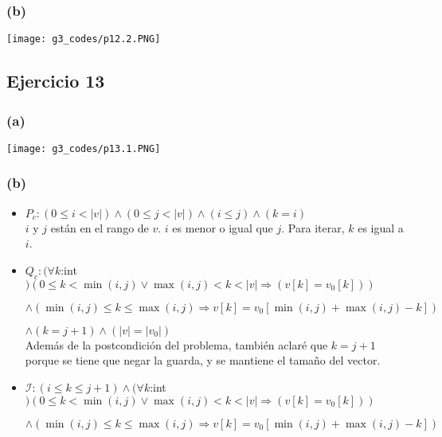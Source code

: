 \documentclass[12 pt]{article}
\begin{document}
    \subsubsection*{(b)}
        \begin{center}
            \texttt{[image: g3\_codes/p12.2.PNG]}
        \end{center}

\subsection*{Ejercicio 13}
    \subsubsection*{(a)}
        \begin{center}
            \texttt{[image: g3\_codes/p13.1.PNG]}
        \end{center}
    \subsubsection*{(b)}
        \begin{itemize}
            \item $P_{c}: \left(0 \leq i < |v|\right) \wedge \left(0 \leq j < |v|\right) \wedge (i \leq j) \wedge (k = i)$
            \\
            $i$ y $j$ están en el rango de $v$. $i$ es menor o igual que $j$. Para iterar, $k$ es igual a $i$.
            \item $Q_{c}: (\forall k$:int$)\left(0 \leq k < \min(i, j) \vee \max(i, j) < k < |v| \Rightarrow (v[k] = v_{0}[k])\right)$
            
            $\wedge \left(\min(i, j) \leq k \leq \max(i, j) \Rightarrow v[k] = v_{0}[\min(i, j)+\max(i, j)-k]\right)$

            $\wedge (k = j+1) \wedge (|v|=|v_{0}|)$
            \\
            Además de la postcondición del problema, también aclaré que $k = j+1$ porque se tiene que negar la guarda, y se mantiene el tamaño del vector.
            \item $\mathcal{I}: (i \leq k \leq j+1) \wedge (\forall k$:int$)\left(0 \leq k < \min(i, j) \vee \max(i, j) < k < |v| \Rightarrow (v[k] = v_{0}[k])\right) $
            
            $\wedge \left(\min(i, j) \leq k \leq \max(i, j) \Rightarrow v[k] = v_{0}[\min(i, j)+\max(i, j)-k]\right)$
        \end{itemize}
        
\end{document}
